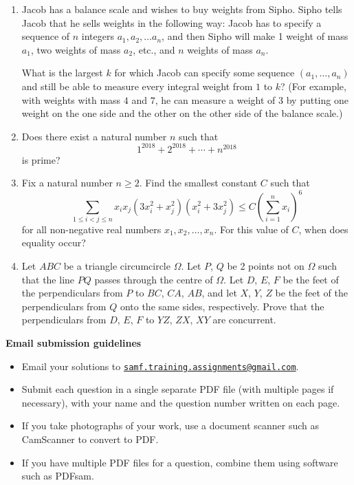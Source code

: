 \documentclass{article}
\begin{document}
\begin{enumerate}[1.]
\vspace{6pt}
\item %
Jacob has a balance scale and wishes to buy weights from Sipho. Sipho tells Jacob that he sells weights in the following way: Jacob has to specify a sequence of $n$ integers $a_1, a_2, \dotsc a_n$, and then Sipho will make 1 weight of mass $a_1$, two weights of mass $a_2$, etc., and $n$ weights of mass $a_n$.

What is the largest $k$ for which Jacob can specify some sequence $(a_1, \dotsc, a_n)$ and still be able to measure every integral weight from $1$ to $k$? (For example, with weights with mass $4$ and $7$, he can measure a weight of $3$ by putting one weight on the one side and the other on the other side of the balance scale.)


\vspace{6pt}
\item
Does there exist a natural number $n$ such that
\[
	1^{2018} + 2^{2018} + \cdots + n^{2018}
\]
is prime?


\vspace{6pt}
\item %
Fix a natural number $n \geq 2$. Find the smallest constant $C$ such that
\[
	 \sum_{1 \leq i < j \leq n} x_i x_j (3x_i^2 + x_j^2)(x_i^2 + 3x_j^2) \leq C {\left( \sum_{i = 1}^{n} x_i \right)}^6
\]
for all non-negative real numbers $x_1, x_2, \dots, x_n$. For this value of $C$, when does equality occur?


\item Let $ABC$ be a triangle circumcircle $\Omega$. Let $P$, $Q$ be 2 points not on $\Omega$ such that the line $PQ$ passes through the centre of $\Omega$. Let $D$, $E$, $F$ be the feet of the perpendiculars from $P$ to $BC$, $CA$, $AB$, and let $X$, $Y$, $Z$ be the feet of the perpendiculars from $Q$ onto the same sides, respectively. Prove that the perpendiculars from $D$, $E$, $F$ to $YZ$, $ZX$, $XY$ are concurrent.

\end{enumerate}


\vfill
\textbf{\Large Email submission guidelines}
\begin{itemize}
	\item Email your solutions to \href{mailto:samf.training.assignments@gmail.com}{\texttt{samf.training.assignments@gmail.com}}.
	\item Submit each question in a single separate PDF file (with multiple pages if necessary), with your name and the question number written on each page.
	\item If you take photographs of your work, use a document scanner such as CamScanner to convert to PDF.
	\item If you have multiple PDF files for a question, combine them using software such as PDFsam.
\end{itemize}
\end{document}
